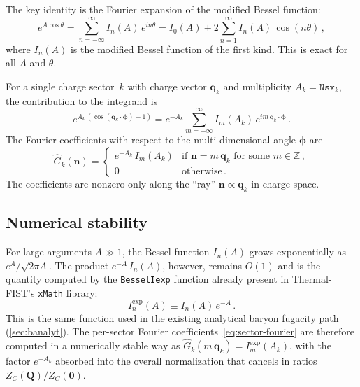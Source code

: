\documentclass[11pt,a4paper]{article}
\newcommand{\bphi}{\bm{\phi}}
\newcommand{\bq}{\bm{q}}
\newcommand{\bQ}{\bm{Q}}
\begin{document}
The key identity is the Fourier expansion of the modified Bessel function:
\begin{equation}\label{eq:bessel-fourier}
  e^{A\cos\theta} = \sum_{n=-\infty}^{\infty} I_n(A)\,e^{in\theta}
  = I_0(A) + 2\sum_{n=1}^{\infty} I_n(A)\,\cos(n\theta)\,,
\end{equation}
where $I_n(A)$ is the modified Bessel function of the first kind.
This is exact for all $A$ and $\theta$.

For a single charge sector~$k$ with charge vector $\bq_k$ and multiplicity $A_k = \texttt{Nsx}_k$, the contribution to the integrand is
\begin{equation}\label{eq:sector-contribution}
  e^{A_k\,(\cos(\bq_k \cdot \bphi) - 1)}
  = e^{-A_k} \sum_{m=-\infty}^{\infty} I_m(A_k)\,e^{im\,\bq_k \cdot \bphi}\,.
\end{equation}
The Fourier coefficients with respect to the multi-dimensional angle $\bphi$ are
\begin{equation}\label{eq:sector-fourier}
  \widehat{G}_k(\bm{n}) = \begin{cases}
    e^{-A_k}\,I_m(A_k) & \text{if } \bm{n} = m\,\bq_k \text{ for some } m \in \mathbb{Z}\,, \\
    0 & \text{otherwise}\,.
  \end{cases}
\end{equation}
The coefficients are nonzero only along the ``ray'' $\bm{n} \propto \bq_k$ in charge space.

\subsection{Numerical stability}
\label{sec:bessel-stability}

For large arguments $A \gg 1$, the Bessel function $I_n(A)$ grows exponentially as $e^A / \sqrt{2\pi A}$.
The product $e^{-A}\,I_n(A)$, however, remains $O(1)$ and is the quantity computed by the \texttt{BesselIexp} function already present in Thermal-FIST's \texttt{xMath} library:
\begin{equation}\label{eq:besselIexp}
  I_n^{\exp}(A) \equiv I_n(A)\,e^{-A}\,.
\end{equation}
This is the same function used in the existing analytical baryon fugacity path (\cref{sec:banalyt}).
The per-sector Fourier coefficients~\cref{eq:sector-fourier} are therefore computed in a numerically stable way as $\widehat{G}_k(m\,\bq_k) = I_m^{\exp}(A_k)$, with the factor $e^{-A_k}$ absorbed into the overall normalization that cancels in ratios $Z_C(\bQ)/Z_C(\bm{0})$.
\end{document}
